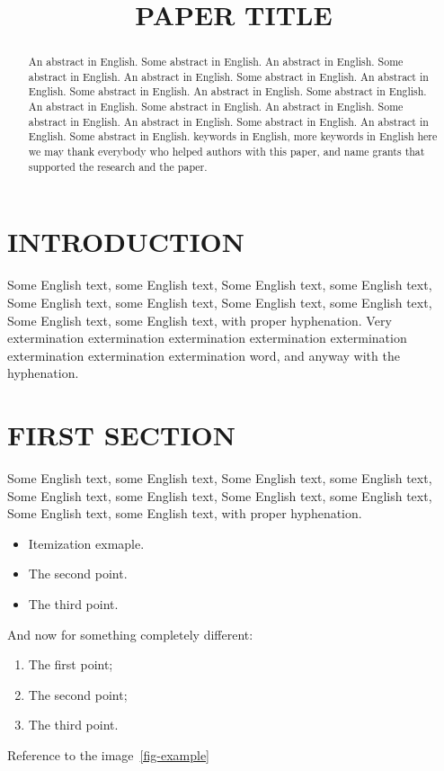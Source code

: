 \documentclass[intlimits,twoside,a4paper,11pt]{article}
\title[Paper title]{PAPER TITLE}
\affiliation{1}{The first university, address, city, post index, country}
\affiliation{2}{The second university, address, city, post index, country}
\begin{document}
    \maketitle

    \begin{abstract}
        An abstract in English. Some abstract in English. An abstract in English. Some abstract in English. An abstract in English. Some abstract in English. An abstract in English. Some abstract in English. An abstract in English. Some abstract in English. An abstract in English. Some abstract in English. An abstract in English. Some abstract in English. An abstract in English. Some abstract in English. An abstract in English. Some abstract in English.
        \keywords keywords in English, more keywords in English
        \autocitationexample
        \acknowledgements here we may thank everybody who helped authors with this paper, and name grants that supported the research and the paper.
    \end{abstract}

    \section{INTRODUCTION}
    Some English text, some English text, Some English text, some English text, Some English text, some English text, Some English text, some English text, Some English text, some English text, with proper hyphenation. Very extermination extermination extermination extermination extermination extermination extermination extermination word, and anyway with the hyphenation.

    \section{FIRST SECTION}
    Some English text, some English text, Some English text, some English text, Some English text, some English text, Some English text, some English text, Some English text, some English text, with proper hyphenation.
    \begin{itemize}
        \item Itemization exmaple.
        \item The second point.
        \item The third point.
    \end{itemize}

    And now for something completely different:
    \begin{enumerate}
        \item The first point;
        \item The second point;
        \item The third point.
    \end{enumerate}
    Reference to the image~\ref{fig-example}
\end{document}
